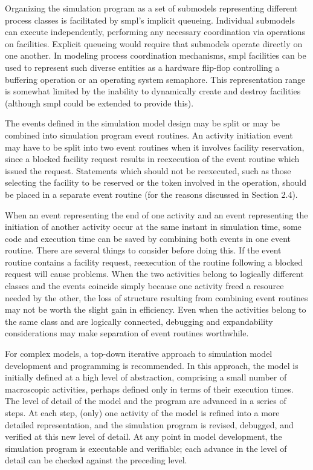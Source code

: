 Organizing the simulation program as a set of submodels representing different
process classes is facilitated by smpl's implicit queueing. Individual
submodels can execute independently, performing any necessary coordination
via operations on facilities. Explicit queueing would require that
\noindent submodels operate directly on one another. In modeling process coordination mechanisms,
smpl facilities can be used to represent such diverse entities as a hardware
flip-flop controlling a buffering operation or an operating system semaphore.
This representation range is somewhat limited by the inability to dynamically
create and destroy facilities (although smpl could be extended to provide
this).

The events defined in the simulation model design may be split or may be
combined into simulation program event routines. An activity initiation event
may have to be split into two event routines when it involves facility
reservation, since a blocked facility request results in reexecution of the
event routine which issued the request. Statements which should not be
reexecuted, such as those selecting the facility to be reserved or the token
involved in the operation, should be placed in a separate event routine (for
the reasons discussed in Section 2.4).

When an event representing the end of one activity and an event representing
 the initiation of another activity occur at the same instant in simulation
time, some code and execution time can be saved by combining both events in
one event routine. There are several things to consider before doing this. If
the event routine contains a facility request, reexecution of the routine
following a blocked request will cause problems. When the two activities
belong to logically different classes and the events coincide simply because
one activity freed a resource needed by the other, the loss of structure
resulting from combining event routines may not be worth the slight gain in
efficiency. Even when the activities belong to the same class and are
logically connected, debugging and expandability considerations may make
separation of event routines worthwhile.

For complex models, a top-down iterative approach to simulation model
development and programming is recommended. In this approach, the model is
initially defined at a high level of abstraction, comprising a small number of
macroscopic activities, perhaps defined only in terms of their execution
times. The level of detail of the model and the program are advanced in a
series of steps. At each step, (only) one activity of the model is refined into
a more detailed representation, and the simulation program is revised,
debugged, and verified at this new level of detail. At any point in model
development, the simulation program is executable and verifiable; each advance
in the level of detail can be checked against the preceding level.

